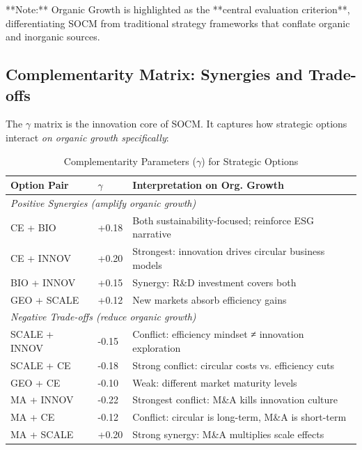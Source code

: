 **Note:** Organic Growth is highlighted as the **central evaluation criterion**, differentiating SOCM from traditional strategy frameworks that conflate organic and inorganic sources.

\subsection{Complementarity Matrix: Synergies and Trade-offs}
\label{subsec:socm-gamma}

The $\gamma$ matrix is the innovation core of SOCM. It captures how strategic options interact \textit{on organic growth specifically}:

\begin{table}[htbp]
\centering
\caption{Complementarity Parameters ($\gamma$) for Strategic Options}
\label{tab:socm-gamma}
\renewcommand{\arraystretch}{1.3}
\begin{tabular}{@{}llp{8cm}@{}}
\toprule
\textbf{Option Pair} & \textbf{$\gamma$} & \textbf{Interpretation on Org. Growth} \\
\midrule
\multicolumn{3}{l}{\textit{Positive Synergies (amplify organic growth)}} \\
CE + BIO & +0.18 & Both sustainability-focused; reinforce ESG narrative \\
CE + INNOV & +0.20 & Strongest: innovation drives circular business models \\
BIO + INNOV & +0.15 & Synergy: R\&D investment covers both \\
GEO + SCALE & +0.12 & New markets absorb efficiency gains \\
\midrule
\multicolumn{3}{l}{\textit{Negative Trade-offs (reduce organic growth)}} \\
SCALE + INNOV & -0.15 & Conflict: efficiency mindset ≠ innovation exploration \\
SCALE + CE & -0.18 & Strong conflict: circular costs vs. efficiency cuts \\
GEO + CE & -0.10 & Weak: different market maturity levels \\
MA + INNOV & -0.22 & Strongest conflict: M\&A kills innovation culture \\
MA + CE & -0.12 & Conflict: circular is long-term, M\&A is short-term \\
MA + SCALE & +0.20 & Strong synergy: M\&A multiplies scale effects \\
\bottomrule
\end{tabular}
\end{table}

